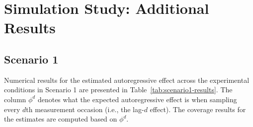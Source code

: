 \documentclass[man]{apa7} %
\begin{document}
\printbibliography

\appendix

\section{Simulation Study: Additional Results} \label{app:simulation}


\subsection{Scenario 1} \label{app:simulation-scenario1}
Numerical results for the estimated autoregressive effect across the experimental conditions in Scenario 1 are presented in Table~\ref{tab:scenario1-results}. The column $\phi^{d}$ denotes what the expected autoregressive effect is when sampling every $d$th measurement occasion (i.e., the lag-$d$ effect). The coverage results for the estimates are computed based on $\phi^{d}$.
\end{document}
